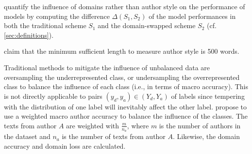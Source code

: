 \citet{bischoff_importance_2020} quantify the influence of domains rather than author style on the performance of models by 
computing the difference $\Delta(S_1,S_2)$ of the model performances in both the traditional scheme $S_1$ 
and the domain-swapped scheme $S_2$ (cf. \autoref{sec:definitions}).

\citet{bischoff_importance_2020} claim that the minimum sufficient length to measure author style is 500 words.

Traditional methods to mitigate the influence of unbalanced data are oversampling the underrepresented class, 
or undersampling the overrepresented class to balance the influence of each class (i.e., in terms of macro accuracy).
This is not directly applicable to pairs $(y_d, y_a) \in (Y_d, Y_a)$ of labels since tempering with the distribution 
of one label will inevitably affect the other label.
\citet{bischoff_importance_2020} propose to use a weighted macro author accuracy to balance the influence of the classes.
The texts from author $A$ are weighted with $\frac{m}{n_a}$, 
where $m$ is the number of authors in the dataset and $n_a$ is the number of texts from author $A$.
Likewise, the domain accuracy and domain loss are calculated.